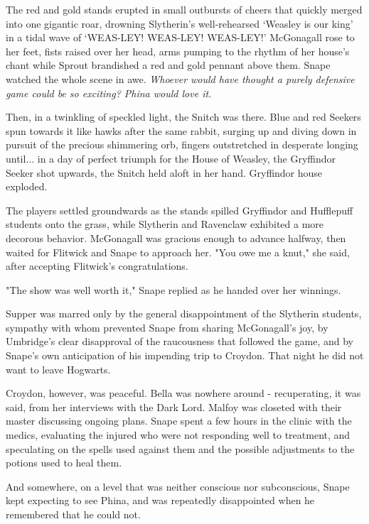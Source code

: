 \documentclass[a4paper,11pt]{article}
\begin{document}
The red and gold stands erupted in small outbursts of cheers that quickly merged into one gigantic roar, drowning Slytherin's well-rehearsed `Weasley is our king' in a tidal wave of `WEAS-LEY! WEAS-LEY! WEAS-LEY!' McGonagall rose to her feet, fists raised over her head, arms pumping to the rhythm of her house's chant while Sprout brandished a red and gold pennant above them. Snape watched the whole scene in awe. \emph{Whoever would have thought a purely defensive game could be so exciting? Phina would love it.}

Then, in a twinkling of speckled light, the Snitch was there. Blue and red Seekers spun towards it like hawks after the same rabbit, surging up and diving down in pursuit of the precious shimmering orb, fingers outstretched in desperate longing until... in a day of perfect triumph for the House of Weasley, the Gryffindor Seeker shot upwards, the Snitch held aloft in her hand. Gryffindor house exploded.

The players settled groundwards as the stands spilled Gryffindor and Hufflepuff students onto the grass, while Slytherin and Ravenclaw exhibited a more decorous behavior. McGonagall was gracious enough to advance halfway, then waited for Flitwick and Snape to approach her. "You owe me a knut," she said, after accepting Flitwick's congratulations.

"The show was well worth it," Snape replied as he handed over her winnings.

Supper was marred only by the general disappointment of the Slytherin students, sympathy with whom prevented Snape from sharing McGonagall's joy, by Umbridge's clear disapproval of the raucousness that followed the game, and by Snape's own anticipation of his impending trip to Croydon. That night he did not want to leave Hogwarts.

Croydon, however, was peaceful. Bella was nowhere around - recuperating, it was said, from her interviews with the Dark Lord. Malfoy was closeted with their master discussing ongoing plans. Snape spent a few hours in the clinic with the medics, evaluating the injured who were not responding well to treatment, and speculating on the spells used against them and the possible adjustments to the potions used to heal them.

And somewhere, on a level that was neither conscious nor subconscious, Snape kept expecting to see Phina, and was repeatedly disappointed when he remembered that he could not.
\end{document}
